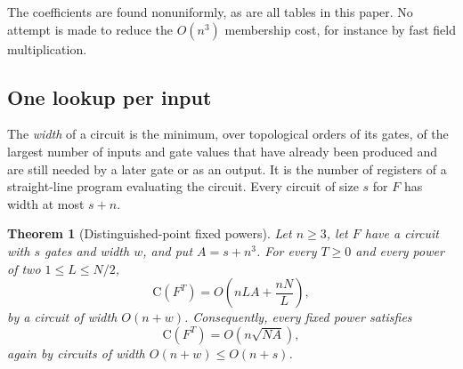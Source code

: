 \documentclass[11pt]{article}
\newtheorem{theorem}{Theorem}[section]
\theoremstyle{definition}
\theoremstyle{remark}
\newcommand{\CC}{\mathrm{C}}
\numberwithin{equation}{section}
\begin{document}
The coefficients are found nonuniformly, as are all tables in this paper.
No attempt is made to reduce the $O(n^3)$ membership cost, for instance by
fast field multiplication.

\subsection{One lookup per input}

The \emph{width} of a circuit is the minimum, over topological orders of
its gates, of the largest number of inputs and gate values that have
already been produced and are still needed by a later gate or as an
output.  It is the number of registers of a straight-line program
evaluating the circuit.  Every circuit of size $s$ for $F$ has width at
most $s+n$.

\begin{theorem}[Distinguished-point fixed powers]\label{thm:distinguished}
Let $n\geq3$, let $F$ have a circuit with $s$ gates and width $w$, and put
$A=s+n^3$.  For every $T\geq0$ and every power of two $1\leq L\leq N/2$,
\begin{equation}\label{eq:dp-tradeoff}
  \CC(F^T)=O\!\left(nLA+\frac{nN}{L}\right),
\end{equation}
by a circuit of width $O(n+w)$.  Consequently, every fixed power satisfies
\begin{equation}\label{eq:dp-optimized}
  \CC(F^T)=O\!\left(n\sqrt{NA}\right),
\end{equation}
again by circuits of width $O(n+w)\leq O(n+s)$.
\end{theorem}
\end{document}
